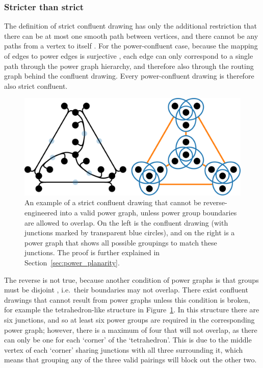 \subsubsection{Stricter than strict}
The definition of strict confluent drawing has only the additional restriction that there can be at most one smooth path between vertices, and there cannot be any paths from a vertex to itself \citep{Eppstein2013}. 
For the power-confluent case, because the mapping of edges to power edges is surjective \citep{Royer2008}, each edge can only correspond to a single path through the power graph hierarchy, and therefore also through the routing graph behind the confluent drawing. Every power-confluent drawing is therefore also strict confluent.

\begin{figure}
  \centering
  \includegraphics[width=\linewidth]{power/stricter.pdf}
  \caption[A strict confluent drawing that is not power-confluent]{An example of a strict confluent drawing that cannot be reverse-engineered into a valid power graph, unless power group boundaries are allowed to overlap. On the left is the confluent drawing (with junctions marked by transparent blue circles), and on the right is a power graph that shows all possible groupings to match these junctions. The proof is further explained in Section~\ref{sec:power_planarity}.}
  \label{fig:strict}
\end{figure}

The reverse is not true, because another condition of power graphs is that groups must be disjoint \citep{Royer2008}, i.e.\ their boundaries may not overlap.
There exist confluent drawings that cannot result from power graphs unless this condition is broken, for example the tetrahedron-like structure in Figure~\ref{fig:strict}.
In this structure there are six junctions, and so at least six power groups are required in the corresponding power graph; however, there is a maximum of four that will not overlap, as there can only be one for each `corner' of the `tetrahedron'. This is due to the middle vertex of each `corner' sharing junctions with all three surrounding it, which means that grouping any of the three valid pairings will block out the other two.

